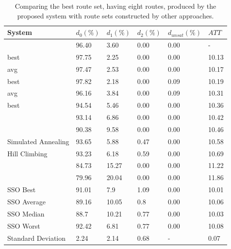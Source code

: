     \begin{table}[H]
    \centering
    \hspace*{-1.0cm}
    \begin{tabular}{|l||l|l|l|l|l|}
    \hline
    \textbf{System} & $d_0(\%)$ & $d_1(\%)$ & $d_2(\%)$ & $d_{unsat}(\%)$ & $ATT$ \\
    \hline
    \citet{nikolic14} & 96.40 & 3.60 & 0.00 & 0.00 & - \\
    \citet{kechagiopoulos14} best & 97.75 & 2.25 & 0.00 & 0.00 & 10.13 \\
    \citet{kechagiopoulos14} avg & 97.47 & 2.53 & 0.00 & 0.00 & 10.17 \\
    \citet{chew12} best & 97.82 & 2.18 & 0.00 & 0.09 & 10.19 \\
    \citet{chew12} avg & 96.16 & 3.84 & 0.00 & 0.09 & 10.31 \\
    \citet{fan10} best & 94.54 & 5.46 & 0.00 & 0.00 & 10.36 \\
    \citet{zhang10} & 93.14 & 6.86 & 0.00 & 0.00 & 10.42 \\
    \citet{chakroborty02} & 90.38 & 9.58 & 0.00 & 0.00 & 10.46 \\
    \citet{fan10} Simulated Annealing & 93.65 & 5.88 & 0.47 & 0.00 & 10.58 \\
    \citet{fan10} Hill Climbing & 93.23 & 6.18 & 0.59 & 0.00 & 10.69 \\
    \citet{kidwai98} & 84.73 & 15.27 & 0.00 & 0.00 & 11.22 \\
    \citet{baaj91} & 79.96 & 20.04 & 0.00 & 0.00 & 11.86 \\ 
    \hline
    SSO Best & 91.01 & 7.9 & 1.09 & 0.00 & 10.01\\
    SSO Average & 89.16 & 10.05 & 0.8 & 0.00 & 10.06\\
    SSO Median & 88.7 & 10.21 & 0.77 & 0.00 & 10.03\\
    SSO Worst & 92.42 & 6.81 & 0.77 & 0.00 & 10.08\\
    Standard Deviation & 2.24 & 2.14 & 0.68 & - & 0.07\\
    \hline
    \end{tabular}
    \caption {Comparing the best route set, having eight routes, produced by the proposed system with route sets constructed by other approaches.}
    \label{table:performanceComparison_8}
    \end{table}






